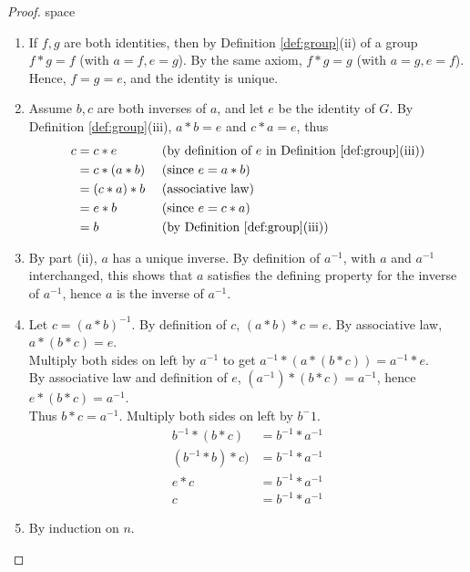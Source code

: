\begin{proof}{\color{white}space}
\begin{enumerate}[label=(\roman*)]
\setlength{\itemsep}{0pt}
\item If $f, g$ are both identities, then by Definition \ref{def:group}(ii) of a group $f*g = f$ (with $a=f, e=g$). By the same axiom, $f*g = g$ (with $a=g, e=f$). Hence, $f=g=e$, and the identity is unique.
\item Assume $b,c$ are both inverses of $a$, and let $e$ be the identity of $G$. By  Definition \ref{def:group}(iii), $a*b = e$ and $c*a = e$, thus
\begin{align}
c &= c*e &&\textnormal{ (by definition of $e$ in Definition \ref{def:group}(iii))} \nonumber \\ 
& = c * (a*b) &&\textnormal{ (since $e = a*b$)} \nonumber \\
& = (c*a) * b &&\textnormal{ (associative law)} \nonumber \\
& = e*b &&\textnormal{ (since $e = c*a$)} \nonumber \\
& = b &&\textnormal{ (by Definition \ref{def:group}(iii))} \nonumber
\end{align}
\item By part (ii), $a$ has a unique inverse. By definition of $a^{-1}$, with $a$ and $a^{-1}$ interchanged, this shows that $a$ satisfies the defining property for the inverse of $a^{-1}$, hence $a$ is the inverse of $a^{-1}$.
\item Let $c=(a*b)^{-1}$. By definition of $c$, $(a*b)*c = e$. By associative law, $a*(b*c) = e$.\\
Multiply both sides on left by $a^{-1}$ to get $a^{-1}*(a*(b*c)) = a^{-1} * e$.\\
By associative law and definition of $e$, $(a^{-1}) * (b*c) = a^{-1}$, hence $e*(b*c) = a^{-1}$.\\
Thus $b*c = a^{-1}$. Multiply both sides on left by $b^-1$.
\begin{align}
b^{-1} * (b*c) &= b^{-1} * a^{-1} \nonumber \\
(b^{-1} * b)*c) &= b^{-1} * a^{-1} \nonumber \\
e*c &= b^{-1} * a^{-1} \nonumber \\
c &= b^{-1} * a^{-1} \nonumber
\end{align}
\item By induction on $n$.  \label{wip:proofgroupop}
\end{enumerate}
\end{proof}

